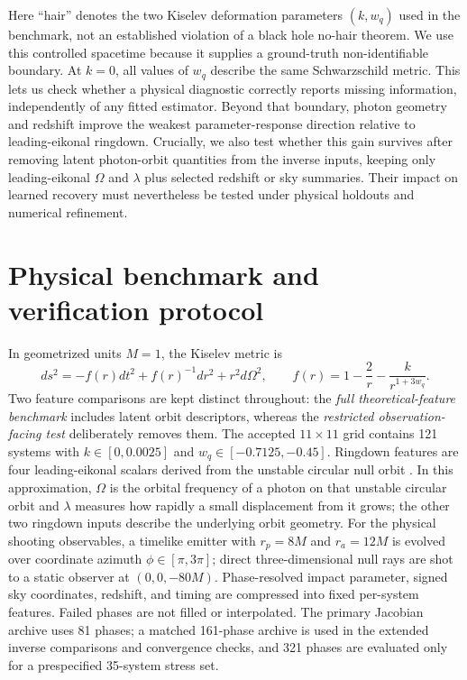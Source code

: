 \documentclass{article}
\newcommand{\wq}{w_q}
\begin{document}
Here ``hair'' denotes the two Kiselev deformation parameters $(k,w_q)$ used in the benchmark, not an established violation of a black hole no-hair theorem. We use this controlled spacetime \citep{kiselev2003} because it supplies a ground-truth non-identifiable boundary. At $k=0$, all values of $w_q$ describe the same Schwarzschild metric. This lets us check whether a physical diagnostic correctly reports missing information, independently of any fitted estimator. Beyond that boundary, photon geometry and redshift improve the weakest parameter-response direction relative to leading-eikonal ringdown. Crucially, we also test whether this gain survives after removing latent photon-orbit quantities from the inverse inputs, keeping only leading-eikonal $\Omega$ and $\lambda$ plus selected redshift or sky summaries. Their impact on learned recovery must nevertheless be tested under physical holdouts and numerical refinement.


\section{Physical benchmark and verification protocol}
In geometrized units $M=1$, the Kiselev metric is
\begin{equation}
 ds^2=-f(r)dt^2+f(r)^{-1}dr^2+r^2d\Omega^2,\qquad f(r)=1-\frac{2}{r}-\frac{k}{r^{1+3\wq}}.
\end{equation}
Two feature comparisons are kept distinct throughout: the \emph{full theoretical-feature benchmark} includes latent orbit descriptors, whereas the \emph{restricted observation-facing test} deliberately removes them. The accepted $11\times11$ grid contains 121 systems with $k\in[0,0.0025]$ and $w_q\in[-0.7125,-0.45]$. Ringdown features are four leading-eikonal scalars derived from the unstable circular null orbit \citep{cardoso2009,konoplya2017}. In this approximation, $\Omega$ is the orbital frequency of a photon on that unstable circular orbit and $\lambda$ measures how rapidly a small displacement from it grows; the other two ringdown inputs describe the underlying orbit geometry. For the physical shooting observables, a timelike emitter with $r_p=8M$ and $r_a=12M$ is evolved over coordinate azimuth $\phi\in[\pi,3\pi]$; direct three-dimensional null rays are shot to a static observer at $(0,0,-80M)$. Phase-resolved impact parameter, signed sky coordinates, redshift, and timing are compressed into fixed per-system features. Failed phases are not filled or interpolated. The primary Jacobian archive uses 81 phases; a matched 161-phase archive is used in the extended inverse comparisons and convergence checks, and 321 phases are evaluated only for a prespecified 35-system stress set.
\end{document}
